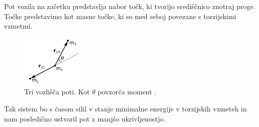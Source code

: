 \documentclass[final,5p,times,twocolumn]{elsarticle}
\begin{document}
Pot vozila na začetku predstavlja nabor točk, ki tvorijo središčnico znotraj proge. Točke predstavimo kot masne točke, ki so med seboj povezane s torzijskimi vzmetmi.
\begin{figure}[H]
	\centering
	\includegraphics[width=3cm]{slika5.png}
	\caption{Tri vozlišča poti. Kot $\theta$ povzorča moment \cite{VAS}.}
	\label{fig:slika}
\end{figure}
Tak sistem bo s časom silil v stanje minimalne energije v torzijskih vzmeteh in nam posledično ustvaril pot z manjšo ukrivljenostjo.
\end{document}
